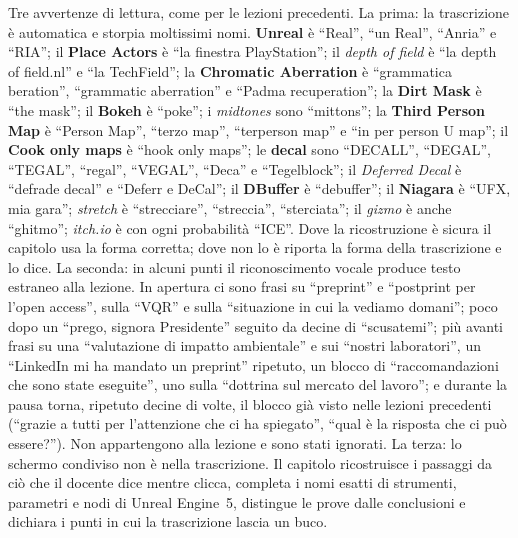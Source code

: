 Tre avvertenze di lettura, come per le lezioni precedenti. La prima: la trascrizione è
automatica e storpia moltissimi nomi. \textbf{Unreal} è ``Real'', ``un Real'', ``Anria'' e
``RIA''; il \textbf{Place Actors} è ``la finestra PlayStation''; il \emph{depth of field} è
``la depth of field.nl'' e ``la TechField''; la \textbf{Chromatic Aberration} è ``grammatica
beration'', ``grammatic aberration'' e ``Padma recuperation''; la \textbf{Dirt Mask} è ``the
mask''; il \textbf{Bokeh} è ``poke''; i \emph{midtones} sono ``mittons''; la
\textbf{Third Person Map} è ``Person Map'', ``terzo map'', ``terperson map'' e ``in per
person U map''; il \textbf{Cook only maps} è ``hook only maps''; le \textbf{decal} sono
``DECALL'', ``DEGAL'', ``TEGAL'', ``regal'', ``VEGAL'', ``Deca'' e ``Tegelblock''; il
\emph{Deferred Decal} è ``defrade decal'' e ``Deferr e DeCal''; il \textbf{DBuffer} è
``debuffer''; il \textbf{Niagara} è ``UFX, mia gara''; \emph{stretch} è ``strecciare'',
``streccia'', ``sterciata''; il \emph{gizmo} è anche ``ghitmo''; \emph{itch.io} è con ogni
probabilità ``ICE''. Dove la ricostruzione è sicura il capitolo usa la forma corretta; dove
non lo è riporta la forma della trascrizione e lo dice. La seconda: in alcuni punti il
riconoscimento vocale produce testo estraneo alla lezione. In apertura ci sono frasi su
``preprint'' e ``postprint per l'open access'', sulla ``VQR'' e sulla ``situazione in cui la
vediamo domani''; poco dopo un ``prego, signora Presidente'' seguito da decine di
``scusatemi''; più avanti frasi su una ``valutazione di impatto ambientale'' e sui ``nostri
laboratori'', un ``LinkedIn mi ha mandato un preprint'' ripetuto, un blocco di
``raccomandazioni che sono state eseguite'', uno sulla ``dottrina sul mercato del lavoro''; e
durante la pausa torna, ripetuto decine di volte, il blocco già visto nelle lezioni
precedenti (``grazie a tutti per l'attenzione che ci ha spiegato'', ``qual è la risposta che
ci può essere?''). Non appartengono alla lezione e sono stati ignorati. La terza: lo schermo
condiviso non è nella trascrizione. Il capitolo ricostruisce i passaggi da ciò che il docente
dice mentre clicca, completa i nomi esatti di strumenti, parametri e nodi di Unreal
Engine~5, distingue le prove dalle conclusioni e dichiara i punti in cui la trascrizione
lascia un buco.

